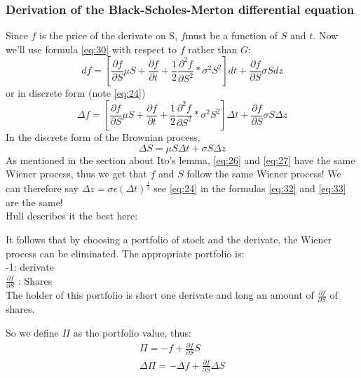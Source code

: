 \documentclass{article}
\begin{document}
\subsubsection{Derivation of the Black-Scholes-Merton differential equation}
Since $f$ is the price of the derivate on S, $f$must be a function of $S$ and $t$. Now we’ll use formula \ref{eq:30} with respect to $f$ rather than $G$:
\begin{equation} \label{eq:31}
    df = \left[\frac{\partial f }{\partial S} \mu S + \frac{\partial f }{\partial t} + \frac{1}{2}\frac{\partial^{2} f }{\partial S^{2}} * \sigma^{2} S^{2}\right]dt + \frac{\partial f }{\partial S} \sigma S dz
\end{equation}
or in discrete form (note \ref{eq:24})
\begin{equation} \label{eq:32}
    \Delta f = \left[\frac{\partial f }{\partial S} \mu S + \frac{\partial f }{\partial t} + \frac{1}{2}\frac{\partial^{2} f }{\partial S^{2}} * \sigma^{2} S^{2}\right]\Delta t + \frac{\partial f }{\partial S} \sigma S \Delta z
\end{equation}
In the discrete form of the Brownian process, 
\begin{equation}\label{eq:33}
        \Delta S = \mu S \Delta t + \sigma S \Delta z
    \end{equation}
As mentioned in the section about Ito’s lemma, \ref{eq:26} and \ref{eq:27} have the same Wiener process, thus we get that $f$ and $S$ follow the same Wiener process! We can therefore say $\Delta z = \sigma \epsilon (\Delta t)^{\frac{1}{2}}$ see \ref{eq:24} in the formulas \ref{eq:32} and \ref{eq:33} are the same! \\ [2ex]
Hull describes it the best here:
\begin{displayquote}
It follows that by choosing a portfolio of stock and the derivate, the Wiener process can be eliminated. The appropriate portfolio is: \\
-1: derivate\\
$\frac{\partial f }{\partial S} $ : Shares\\ [2ex]
The holder of this portfolio is short one derivate and long an amount of $\frac{\partial f }{\partial S}$ of shares.
\end{displayquote}
So we define $\Pi$ as the portfolio value, thus:
\begin{equation}\label{eq;34}
\begin{split}
    \Pi = -f + \frac{\partial f }{\partial S} S \\
    \Delta \Pi = -\Delta f + \frac{\partial f }{\partial S} \Delta S
\end{split}
\end{equation}
\end{document}
